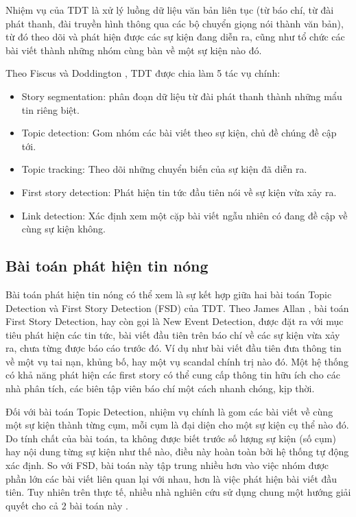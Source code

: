 	Nhiệm vụ của TDT là xử lý luồng dữ liệu văn bản liên tục (từ báo chí, từ đài phát thanh, đài truyền hình thông qua các bộ chuyển giọng nói thành văn bản), từ đó theo dõi và phát hiện được các sự kiện đang diễn ra, cũng như tổ chức các bài viết thành những nhóm cùng bàn về một sự kiện nào đó.
	
	Theo Fiscus và Doddington \cite{Fiscus:TDTDefinition}, TDT được chia làm 5 tác vụ chính: 
		\begin{itemize}
			\item Story segmentation: phân đoạn dữ liệu từ đài phát thanh thành những mẩu tin riêng biệt.
			\item Topic detection: Gom nhóm các bài viết theo sự kiện, chủ đề chúng đề cập tới.
			\item Topic tracking: Theo dõi những chuyển biến của sự kiện đã diễn ra.
			\item First story detection: Phát hiện tin tức đầu tiên nói về sự kiện vừa xảy ra.
			\item Link detection: Xác định xem một cặp bài viết ngẫu nhiên có đang đề cập về cùng sự kiện không.
		\end{itemize}

	\subsection{Bài toán phát hiện tin nóng}
	Bài toán phát hiện tin nóng có thể xem là sự kết hợp giữa hai bài toán Topic Detection và First Story Detection (FSD) của TDT\@. Theo James Allan \cite{Allan:2002:ITD:772260.772262}, bài toán First Story Detection, hay còn gọi là New Event Detection, được đặt ra với mục tiêu phát hiện các tin tức, bài viết đầu tiên trên báo chí về các sự kiện vừa xảy ra, chưa từng được báo cáo trước đó. Ví dụ như bài viết đầu tiên đưa thông tin về một vụ tai nạn, khủng bố, hay một vụ scandal chính trị nào đó. Một hệ thống có khả năng phát hiện các first story có thể cung cấp thông tin hữu ích cho các nhà phân tích, các biên tập viên báo chí một cách nhanh chóng, kịp thời.
	
	Đối với bài toán Topic Detection, nhiệm vụ chính là gom các bài viết về cùng một sự kiện thành từng cụm, mỗi cụm là đại diện cho một sự kiện cụ thể nào đó. Do tính chất của bài toán, ta không được biết trước số lượng sự kiện (số cụm) hay nội dung từng sự kiện như thế nào, điều này hoàn toàn bởi hệ thống tự động xác định. So với FSD, bài toán này tập trung nhiều hơn vào việc nhóm được phần lớn các bài viết liên quan lại với nhau, hơn là việc phát hiện bài viết đầu tiên. Tuy nhiên trên thực tế, nhiều nhà nghiên cứu sử dụng chung một hướng giải quyết cho cả 2 bài toán này \cite{Allan:2002:ITD:772260.772262}.
	

